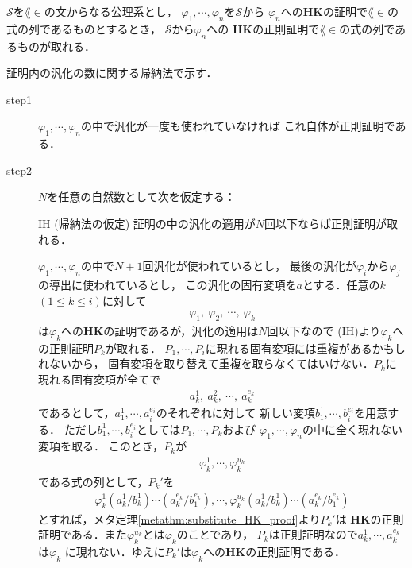 	\begin{screen}
		\begin{metathm}[どんな証明も正則化できる]
		\label{metathm:regularization_of_HK_proof}
			$\mathscr{S}$を$\lang{\in}$の文からなる公理系とし，
			$\varphi_{1},\cdots,\varphi_{n}$を$\mathscr{S}$から
			$\varphi_{n}$への{\bf HK}の証明で$\lang{\in}$の式の列であるものとするとき，
			$\mathscr{S}$から$\varphi_{n}$への
			{\bf HK}の正則証明で$\lang{\in}$の式の列であるものが取れる．
		\end{metathm}
	\end{screen}
	
	\begin{metaprf}
		証明内の汎化の数に関する帰納法で示す．
		\begin{description}
			\item[step1] $\varphi_{1},\cdots,\varphi_{n}$の中で汎化が一度も使われていなければ
				これ自体が正則証明である．
				
			\item[step2] $N$を任意の自然数として次を仮定する：
				\begin{itembox}[l]{IH (帰納法の仮定)}
					証明の中の汎化の適用が$N$回以下ならば正則証明が取れる．
				\end{itembox}
				
				$\varphi_{1},\cdots,\varphi_{n}$の中で$N+1$回汎化が使われているとし，
				最後の汎化が$\varphi_{i}$から$\varphi_{j}$の導出に使われているとし，
				この汎化の固有変項を$a$とする．任意の$k$ $(1 \leq k \leq i)$に対して
				\begin{align}
					\varphi_{1},\ \varphi_{2},\ \cdots,\ \varphi_{k}
				\end{align}
				は$\varphi_{k}$への{\bf HK}の証明であるが，汎化の適用は$N$回以下なので
				(IH)より$\varphi_{k}$への正則証明$P_{k}$が取れる．
				$P_{1},\cdots,P_{i}$に現れる固有変項には重複があるかもしれないから，
				固有変項を取り替えて重複を取らなくてはいけない．$P_{k}$に現れる固有変項が全てで
				\begin{align}
					a_{k}^{1},\ a_{k}^{2},\ \cdots,\ a_{k}^{e_{k}}
				\end{align}
				であるとして，$a_{1}^{1},\cdots,a_{i}^{e_{i}}$のそれぞれに対して
				新しい変項$b_{1}^{1},\cdots,b_{i}^{e_{i}}$を用意する．
				ただし$b_{1}^{1},\cdots,b_{i}^{e_{i}}$としては$P_{1},\cdots,P_{k}$および
				$\varphi_{1},\cdots,\varphi_{n}$の中に全く現れない変項を取る．
				このとき，$P_{k}$が
				\begin{align}
					\varphi_{k}^{1},\cdots,\varphi_{k}^{u_{k}}
				\end{align}
				である式の列として，$P_{k}'$を
				\begin{align}
					\varphi_{k}^{1}(a_{k}^{1}/b_{k}^{1})\cdots(a_{k}^{e_{k}}/b_{1}^{e_{k}}),\cdots,
					\varphi_{k}^{u_{k}}(a_{k}^{1}/b_{k}^{1})\cdots(a_{k}^{e_{k}}/b_{1}^{e_{k}})
				\end{align}
				とすれば，メタ定理\ref{metathm:substitute_HK_proof}より$P_{k}'$は
				{\bf HK}の正則証明である．また$\varphi_{k}^{u_{k}}$とは$\varphi_{k}$のことであり，
				$P_{k}$は正則証明なので$a_{k}^{1},\cdots,a_{k}^{e_{k}}$は$\varphi_{k}$
				に現れない．ゆえに$P_{k}'$は$\varphi_{k}$への{\bf HK}の正則証明である．
				

\end{description}
\end{metaprf}
